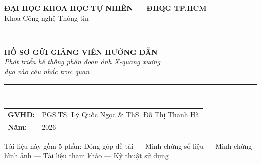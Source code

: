 \documentclass[12pt,a4paper]{article}
\begin{document}
\begin{titlepage}
    \centering
    \vspace*{2cm}
    {\Large \textbf{ĐẠI HỌC KHOA HỌC TỰ NHIÊN — ĐHQG TP.HCM}}\\[0.5cm]
    {\large Khoa Công nghệ Thông tin}\\[2cm]

    \rule{\textwidth}{1.5pt}\\[0.4cm]
    {\LARGE \textbf{HỒ SƠ GỬI GIẢNG VIÊN HƯỚNG DẪN}}\\[0.3cm]
    {\large \textit{Phát triển hệ thống phân đoạn ảnh X-quang xương}}\\
    {\large \textit{dựa vào câu nhắc trực quan}}\\[0.3cm]
    \rule{\textwidth}{1.5pt}\\[1.5cm]

    \begin{tabular}{ll}
        \textbf{GVHD:}                  & PGS.TS. Lý Quốc Ngọc \& ThS. Đỗ Thị Thanh Hà \\[0.3cm]
        \textbf{Năm:}                   & 2026 \\[0.3cm]
    \end{tabular}

    \vfill
    {\small Tài liệu này gồm 5 phần: Đóng góp đề tài — Minh chứng số liệu — Minh chứng hình ảnh — Tài liệu tham khảo — Kỹ thuật sử dụng}
\end{titlepage}

\tableofcontents
\newpage


\newpage


\newpage


\newpage


\newpage


\end{document}
